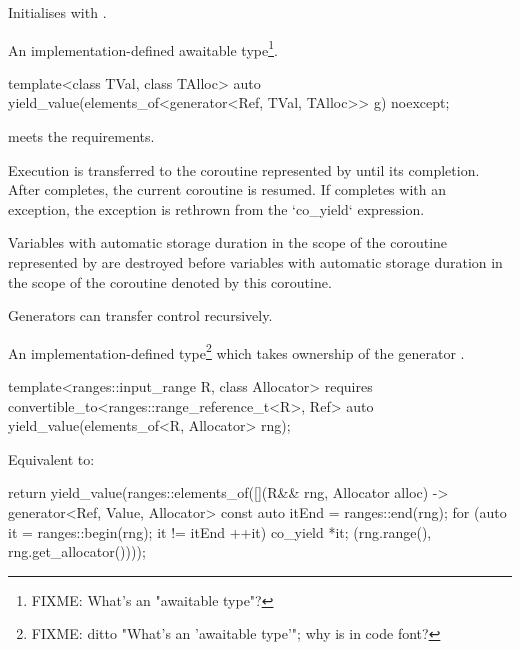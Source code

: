\documentclass{wg21}
\begin{document}
\begin{addedblock}
\begin{itemdescr}
\effects
Initialises  with .

\returns An implementation-defined awaitable type\footnote{FIXME: What's an "awaitable type"?}.
\end{itemdescr}


\begin{itemdecl}
template<class TVal, class TAlloc>
auto yield_value(elements_of<generator<Ref, TVal, TAlloc>> g) noexcept;
\end{itemdecl}

\begin{itemdescr}
\mandates \item {} meets the  requirements.

\effects
Execution is transferred to the coroutine represented by  until its completion.
After  completes, the current coroutine is resumed.
If  completes with an exception, the exception is rethrown from the `co_yield` expression.

Variables with automatic storage duration in the scope of the coroutine represented by  are destroyed
before variables with automatic storage duration in the scope of the coroutine denoted by this coroutine.

\begin{note}
Generators can transfer control recursively.
\end{note}

\returns
An implementation-defined  type\footnote{FIXME: ditto "What's an 'awaitable type'"; why is  in code font?}
which takes ownership of the generator .
\end{itemdescr}


\begin{itemdecl}
template<ranges::input_range R, class Allocator>
requires convertible_to<ranges::range_reference_t<R>, Ref>
auto yield_value(elements_of<R, Allocator> rng);
\end{itemdecl}

\begin{itemdescr}
\effects
Equivalent to:
\begin{codeblock}
{
    return yield_value(ranges::elements_of([](R&& rng, Allocator alloc)
    -> generator<Ref, Value, Allocator> {
        const auto itEnd = ranges::end(rng);
        for (auto it = ranges::begin(rng); it != itEnd ++it) {
            co_yield *it;
        }
    }(rng.range(), rng.get_allocator())));
}
\end{codeblock}


\end{itemdescr}
\end{addedblock}
\end{document}
